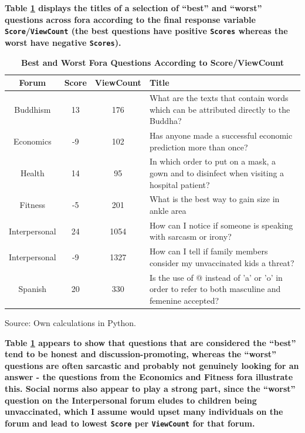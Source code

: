 \documentclass[11pt,preprint, authoryear]{article}
\numberwithin{equation}{section}
\numberwithin{figure}{section}
\begin{document}
\textbf{Table \ref{tab:bestworst} displays the titles of a selection of
``best'' and ``worst'' questions across fora according to the final
response variable \texttt{Score}/\texttt{ViewCount} (the best questions
have positive \texttt{Scores} whereas the worst have negative
\texttt{Scores}).}

\footnotesize

\begin{longtable} {@{} cccp{11cm} @{}}
\caption{\textbf{Best and Worst Fora Questions According to Score/ViewCount}}
\label{tab:bestworst}\\ \hline \hline
\textbf{Forum} & \textbf{Score} & \textbf{ViewCount} & \textbf{Title} \\ 
\hline
Buddhism & 13 & 176 & What are the texts that contain words which can be attributed directly to the Buddha? \\
\hline
Economics & -9 & 102 & Has anyone made a successful economic prediction more than once? \\
\hline
Health & 14 & 95 & In which order to put on a mask, a gown and to disinfect when visiting a hospital patient? \\ 
\hline
Fitness & -5 & 201 & What is the best way to gain size in ankle area \\ 
\hline
Interpersonal & 24 & 1054 & How can I notice if someone is speaking with sarcasm or irony? \\ 
\hline
Interpersonal & -9 & 1327 & How can I tell if family members consider my unvaccinated kids a threat? \\ 
\hline
Spanish & 20 & 330 & Is the use of @ instead of 'a' or 'o' in order to refer to both masculine and femenine accepted? \\ 
\hline \hline
\end{longtable}\begin{center} Source: Own calculations in Python.\end{center}

\normalsize

\textbf{Table \ref{tab:bestworst} appears to show that questions that
are considered the ``best'' tend to be honest and discussion-promoting,
whereas the ``worst'' questions are often sarcastic and probably not
genuinely looking for an answer - the questions from the Economics and
Fitness fora illustrate this. Social norms also appear to play a strong
part, since the ``worst'' question on the Interpersonal forum eludes to
children being unvaccinated, which I assume would upset many individuals
on the forum and lead to lowest \texttt{Score} per \texttt{ViewCount}
for that forum.}
\end{document}
